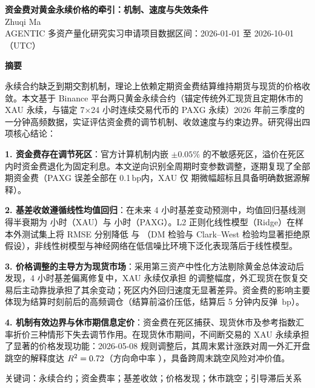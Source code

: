 \documentclass[UTF8,zihao=5,a4paper]{ctexart}
\newcommand{\key}[1]{\textbf{#1}}
\newcommand{\bp}{\ensuremath{\,\mathrm{bp}}}
\begin{document}
\begin{center}
{\LARGE\bfseries\heiti\color{accent} 资金费对黄金永续价格的牵引：机制、速度与失效条件}\\[2pt]
{\large Zhuqi Ma}\\[1pt]
{\small AGENTIC 多资产量化研究实习申请项目\qquad 数据区间：2026-01-01 至 2026-10-01（UTC）}
\end{center}

\vspace{-6pt}
\begin{center}{\heiti\bfseries 摘\quad 要}\end{center}
\vspace{-10pt}
{\small\setlength{\leftskip}{1.5em}\setlength{\rightskip}{1.5em}
永续合约缺乏到期交割机制，理论上依赖定期资金费结算维持期货与现货的价格收敛。本文基于 Binance 平台两只黄金永续合约（锚定传统外汇现货且定期休市的 XAU 永续，与锚定 7$\times$24 小时连续交易代币的 PAXG 永续）2026 年前三季度的一分钟高频数据，实证评估资金费的调节机制、收敛速度与约束边界。研究得出四项核心结论：

\key{1. 资金费存在调节死区}：官方计算机制内嵌 $\pm 0.05\%$ 的不敏感死区，溢价在死区内时资金费退化为固定利息。本文逆向识别全周期时变参数调整，逐期复现了全部 \repXAUn 期资金费（PAXG 误差全部在 0.1\bp 内，XAU 仅 \repXAUbig 期微幅超标且具备明确数据源解释）。

\key{2. 基差收敛遵循线性均值回归}：在未来 4 小时基差变动预测中，均值回归基线测得半衰期为 \dXAUhl 小时（XAU）与 \dPAXGhl 小时（PAXG）。L2 正则化线性模型（Ridge）在样本外测试集上将 RMSE 分别降低 \mXAUgainpct 与 \mPAXGgainpct（DM 检验与 Clark--West 检验均显著拒绝原假设），非线性树模型与神经网络在低信噪比环境下泛化表现落后于线性模型。

\key{3. 价格调整的主导方为现货市场}：采用第三资产中性化方法剔除黄金总体波动后发现，4 小时基差偏离修复中，XAU 永续仅承担 \dXAUshareall 的调整幅度，外汇现货在恢复交易后主动靠拢承担了其余变动；死区内外回归速度无显著差异。资金费的影响主要体现为结算时刻前后的高频调仓（结算前溢价压低，结算后 5 分钟内反弹 \evUpJump\bp）。

\key{4. 机制有效边界与休市期信息定价}：资金费在死区捕获、现货休市及参考指数汇率折价三种情形下失去调节作用。在现货休市期间，不间断交易的 XAU 永续承担了显著的价格发现功能：2026-05-08 规则调整后，其周末累计涨跌对周一外汇开盘跳空的解释度达 $R^2=0.72$（方向命中率 \clWkPosthit），具备跨周末跳空风险对冲价值。\par
\vspace{1pt}
{\heiti 关键词：}永续合约；资金费率；基差收敛；价格发现；休市跳空；引导滞后关系\par}
\end{document}
